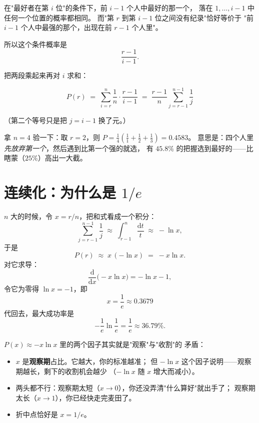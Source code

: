 \documentclass[UTF8,11pt,fontset=macnew]{ctexart}
\begin{document}
\begin{keybox}[关键的一步]
在"最好者在第 $i$ 位"的条件下，前 $i-1$ 个人中最好的那一个，
落在 $1,\dots,i-1$ 中任何一个位置的概率都相同。
而"第 $r$ 到第 $i-1$ 位之间没有纪录"恰好等价于
"前 $i-1$ 个人中最强的那个，出现在前 $r-1$ 个人里"。

所以这个条件概率是
\[
\frac{r-1}{i-1}.
\]
\end{keybox}

把两段乘起来再对 $i$ 求和：

\[
\boxed{\;
P(r)\;=\;\sum_{i=r}^{n}\frac{1}{n}\cdot\frac{r-1}{i-1}
\;=\;\frac{r-1}{n}\sum_{j=r-1}^{n-1}\frac{1}{j}\;}
\]

（第二个等号只是把 $j=i-1$ 换了元。）

拿 $n=4$ 验一下：取 $r=2$，则 $P=\frac14\left(\frac11+\frac12+\frac13\right)=0.4583$。
意思是：四个人里\emph{先放弃第一个}，然后遇到比第一个强的就选，
有 $45.8\%$ 的把握选到最好的——比瞎蒙（$25\%$）高出一大截。

\section{连续化：为什么是 \texorpdfstring{$1/e$}{1/e}}

$n$ 大的时候，令 $x=r/n$，把和式看成一个积分：
\[
\sum_{j=r-1}^{n-1}\frac1j\;\approx\;\int_{r-1}^{n}\frac{\mathrm{d}t}{t}\;\approx\;-\ln x,
\]
于是
\[
P(r)\;\approx\;x\,(-\ln x)\;=\;-x\ln x .
\]
对它求导：
\[
\frac{\mathrm{d}}{\mathrm{d}x}\bigl(-x\ln x\bigr)=-\ln x-1,
\]
令它为零得 $\ln x=-1$，即
\[
\boxed{\;x=\frac1e\approx 0.3679\;}
\]
代回去，最大成功率是
\[
-\frac1e\ln\frac1e=\frac1e\approx 36.79\% .
\]

\begin{keybox}[这个 $1/e$ 在说什么]
$P(x)\approx -x\ln x$ 里的两个因子其实就是"观察"与"收割"的
矛盾：

\begin{itemize}
  \item $x$ 是\textbf{观察期}占比。它越大，你的标准越准；
        但 $-\ln x$ 这个因子说明——观察期越长，剩下的收割机会越少
        （$-\ln x$ 随 $x$ 增大而减小）。
  \item 两头都不行：观察期太短（$x\to0$），你还没弄清"什么算好"就出手了；
        观察期太长（$x\to1$），你已经快走完麦田了。
  \item 折中点恰好是 $x=1/e$。
\end{itemize}
\end{keybox}
\end{document}
